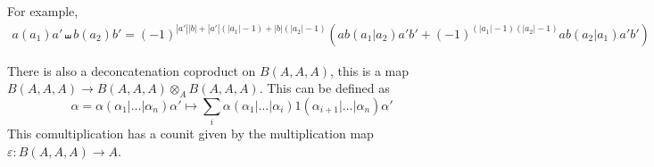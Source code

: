 \documentclass{scrartcl}
\theoremstyle{plain}
\newtheorem{theorem}{Theorem}[section]
\newtheorem{lemma}[theorem]{Lemma}
\theoremstyle{definition}
\newcommand{\N}{\mathbb N}
\newcommand{\abs}[1]{\left\lvert#1\right\rvert}
\let\xto\xrightarrow
\DeclareMathOperator{\id}{id}
\DeclareMathOperator{\colim}{colim}
\begin{document}
For example,
\begin{align*}
    a(a_1)a' \shuffle b(a_2)b' = (-1)^{\abs{a'}\abs{b}+\abs{a'}(\abs{a_1}-1) + \abs{b}(\abs{a_2}-1)}\left(ab(a_1|a_2)a'b' + (-1)^{(\abs{a_1}-1)(\abs{a_2}-1)}ab(a_2|a_1)a'b'\right)
\end{align*}

There is also a deconcatenation coproduct on $B(A, A, A)$, this is a map $B(A, A, A)\to B(A, A, A)\otimes_A B(A, A, A)$. This can be defined as 
$$\alpha = \alpha(\alpha_1|\dots|\alpha_n)\alpha' \mapsto \sum_i\alpha(\alpha_1|\dots|\alpha_i) 1 (\alpha_{i+1}|\dots|\alpha_n)\alpha'$$
This comultiplication has a counit given by the multiplication map $\varepsilon \colon B(A, A, A)\to A$. 

    
\end{document}
